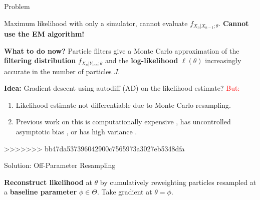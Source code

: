 \documentclass[final]{beamer}
\newlength{\colwidth}
\begin{document}
\begin{frame}[t]
\begin{columns}[t]
\begin{column}{\colwidth}


  \begin{block}{Problem}
  \vspace{-1.6ex}
  \begin{tcolorbox}[enhanced,colback=white!100!white,colframe=red!100!red]
  \begin{center}
  Maximum likelihood with only a simulator, cannot evaluate $f_{X_n|X_{n-1};\theta}$. \textbf{Cannot use the EM algorithm!}
  \end{center}
\end{tcolorbox}

  \textbf{What to do now?} Particle filters give a Monte Carlo approximation of the \textbf{filtering distribution} $f_{X_n|Y_{1:n};\theta}$ and the \textbf{log-likelihood} $\ell(\theta)$ increasingly accurate in the number of particles $J$. 
  
  \textbf{Idea:} Gradient descent using autodiff (AD) on the likelihood estimate? \textcolor{red}{But:}
  \vspace{-2.6ex}
  \begin{enumerate}
      \item Likelihood estimate not differentiable due to Monte Carlo resampling.
      \item Previous work \cite{corenflos21, naesseth18, poyiadjis11, scibior21} on this is computationally expensive \cite{corenflos21}, has uncontrolled asymptotic bias \cite{naesseth18}, or has high variance \cite{poyiadjis11, scibior21}. 
  \end{enumerate}
  \vspace{1ex}
>>>>>>> bb47da537396042900c7565973a3027eb5348dfa
  \end{block}
  
  \begin{alertblock}{Solution: Off-Parameter Resampling}

    \textbf{Reconstruct likelihood} at $\theta$ by cumulatively reweighting particles resampled at a \textbf{baseline parameter} $\phi \in \Theta$. Take gradient at $\theta=\phi$.


\end{alertblock}
\end{column}
\end{columns}
\end{frame}
\end{document}
